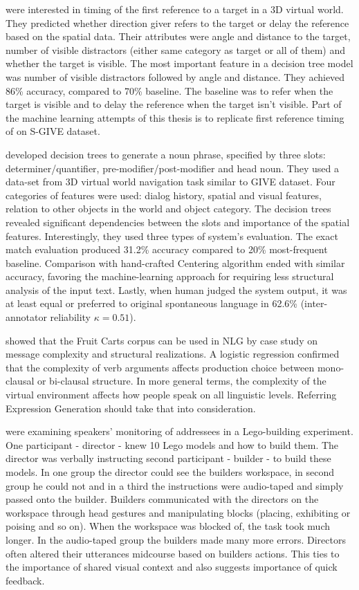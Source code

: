 \citet{stoia2006sentence} were interested in timing of the first reference to a target in a 3D virtual world. They predicted whether direction giver refers to the target or delay the reference based on the spatial data. Their attributes were angle and distance to the target, number of visible distractors (either same category as target or all of them) and whether the target is visible. The most important feature in a decision tree model was number of visible distractors followed by angle and distance. They achieved 86\% accuracy, compared to 70\% baseline. The baseline was to refer when the target is visible and to delay the reference when the target isn't visible. Part of the machine learning attempts of this thesis is to replicate first reference timing of \citet{stoia2006sentence} on S-GIVE dataset.

\citet{stoia2006noun} developed decision trees to generate a noun phrase, specified by three slots: determiner/quantifier, pre-modifier/post-modifier and head noun. They used a data-set from 3D virtual world navigation task similar to GIVE dataset. Four categories of features were used: dialog history, spatial and visual features, relation to other objects in the world and object category. The decision trees revealed significant dependencies between the slots and importance of the spatial features. Interestingly, they used three types of system's evaluation. The exact match evaluation produced 31.2\% accuracy compared to 20\% most-frequent baseline. Comparison with hand-crafted Centering algorithm \citep{kibble2000integrated} ended with similar accuracy, favoring the machine-learning approach for requiring less structural analysis of the input text. Lastly, when human judged the system output, it was at least equal or preferred to original spontaneous language in 62.6\% (inter-annotator reliability $\kappa = 0.51$).

\citet{gallo2008production} showed that the Fruit Carts corpus can be used in NLG by case study on message complexity and structural realizations. A logistic regression confirmed that the complexity of verb arguments affects production choice between mono-clausal or bi-clausal structure. In more general terms, the complexity of the virtual environment affects how people speak on all linguistic levels. Referring Expression Generation should take that into consideration.

\citet{clark2004speaking} were examining speakers' monitoring of addressees in a Lego-building experiment. One participant - director - knew 10 Lego models and how to build them. The director was verbally instructing second participant - builder - to build these models. In one group the director could see the builders workspace, in second group he could not and in a third the instructions were audio-taped and simply passed onto the builder. Builders communicated with the directors on the workspace through head gestures and manipulating blocks (placing, exhibiting or poising and so on). When the workspace was blocked of, the task took much longer. In the audio-taped group the builders made many more errors. Directors often altered their utterances midcourse based on builders actions. This ties to the importance of shared visual context and also suggests importance of quick feedback. 

